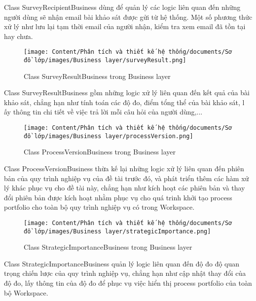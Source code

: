 \par
Class SurveyRecipientBusiness dùng để quản lý các logic liên quan đến những người dùng sẽ nhận email bài khảo sát được gửi từ hệ thống. 
Một số phương thức xử lý như lưu lại tạm thời email của người nhận, kiểm tra xem email đã tồn tại hay chưa.
\begin{figure}[H]
    \centering
    \texttt{[image: Content/Phân tích và thiết kế hệ thống/documents/Sơ đồ lớp/images/Business layer/surveyResult.png]}
    \vspace{0.5cm}
    \caption{Class SurveyResultBusiness trong Business layer}
    \label{fig:Class SurveyResultBusiness trong Business layer}
\end{figure}
\par
Class SurveyResultBusiness gồm những logic xử lý liên quan đến kết quả của bài khảo sát, chẳng hạn như tính toán các độ đo, điểm tổng thể của bài khảo sát, l
ấy thông tin chi tiết về việc trả lời mỗi câu hỏi của người dùng,...
\begin{figure}[H]
    \centering
    \texttt{[image: Content/Phân tích và thiết kế hệ thống/documents/Sơ đồ lớp/images/Business layer/processVersion.png]}
    \vspace{0.5cm}
    \caption{Class ProcessVersionBusiness trong Business layer}
    \label{fig:Class ProcessVersionBusiness trong Business layer}
\end{figure}
\par
Class ProcessVersionBusiness thừa kế lại những logic xử lý liên quan đến phiên bản của quy trình nghiệp vụ của đề tài trước đó, và 
phát triển thêm các hàm xử lý khác phục vụ cho đề tài này, chẳng hạn như kích hoạt các phiên bản và thay đổi phiên bản được kích hoạt nhằm 
phục vụ cho quá trinh khởi tạo process portfolio cho toàn bộ quy trình nghiệp vụ có trong Workspace.
\begin{figure}[H]
    \centering
    \texttt{[image: Content/Phân tích và thiết kế hệ thống/documents/Sơ đồ lớp/images/Business layer/strategicImportance.png]}
    \vspace{0.5cm}
    \caption{Class StrategicImportanceBusiness trong Business layer}
    \label{fig:Class StrategicImportanceBusiness trong Business layer}
\end{figure}
\par
Class StrategicImportanceBusiness quản lý logic liên quan đến độ đo độ quan trọng chiến lược của quy trình nghiệp vụ, 
chẳng hạn như cập nhật thay đổi của độ đo, lấy thông tin của độ đo để phục vụ việc hiển thị process portfolio của toàn bộ Workspace.
